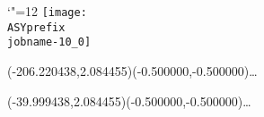 \setlength{\unitlength}{1pt}%
\makeatletter%
\let\ASYencoding\f@encoding%
\let\ASYfamily\f@family%
\let\ASYseries\f@series%
\let\ASYshape\f@shape%
\makeatother%
{\catcode`"=12%
\texttt{[image: \\ASYprefix\\jobname-10\_0]}%
}%
%
\fontsize{12.000000}{14.400000}\selectfont%
\usefont{\ASYencoding}{\ASYfamily}{\ASYseries}{\ASYshape}%
\ASYalign(-206.220438,2.084455)(-0.500000,-0.500000){\ldots}%
%
\fontsize{12.000000}{14.400000}\selectfont%
\ASYalign(-39.999438,2.084455)(-0.500000,-0.500000){\ldots}%
